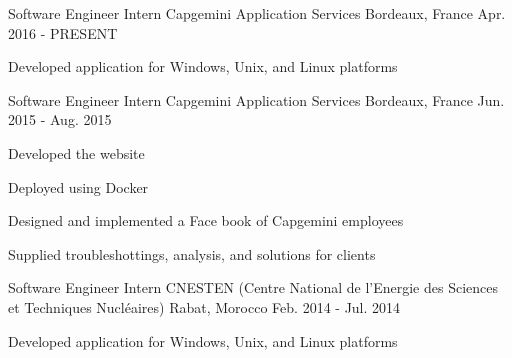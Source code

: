 \begin{cventries}
  	\cventry
    {Software Engineer Intern}
    {Capgemini Application Services}
    {Bordeaux, France}
    {Apr. 2016 - PRESENT}
    {
      \begin{cvitems}
        \item {Developed application for Windows, Unix, and Linux platforms}
      \end{cvitems}
    }
    \cventry
    {Software Engineer Intern}
    {Capgemini Application Services}
    {Bordeaux, France}
    {Jun. 2015 - Aug. 2015}
    {
      \begin{cvitems}
      	\item {Developed the website}
       	\item {Deployed using Docker}
        \item {Designed and implemented a Face book of Capgemini employees}
        \item {Supplied troubleshottings, analysis, and solutions for clients}
      \end{cvitems}
    }
    \cventry
    {Software Engineer Intern}
    {CNESTEN (Centre National de l’Energie des Sciences et Techniques Nucléaires)}
    {Rabat, Morocco}
    {Feb. 2014 - Jul. 2014}
    {
      \begin{cvitems}
        \item {Developed application for Windows, Unix, and Linux platforms}
      \end{cvitems}
    }
\end{cventries}
